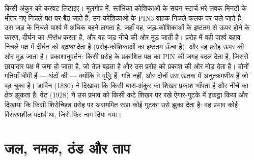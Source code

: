 \begin{example}[गुरुत्वानुवर्तन और प्रकाशानुवर्तन]\label{ex:b3:plant-molecular-physiology:tropism}
किसी अंकुर को करवट लिटाइए। मूलगोप में, स्तंभिका कोशिकाओं के सघन
स्टार्च-भरे लवक मिनटों के भीतर नए निचले पक्ष पर बैठ जाते हैं; उन
कोशिकाओं के PIN3 वाहक निचले फलक पर चले जाते हैं;  उस जड़ के निचले
पार्श्व में अधिक बहने लगता है, जहाँ वह, जड़-कोशिकाओं के इष्टतम से ऊपर
होने के कारण, दीर्घन का \emph{निरोध} करता है, और वह जड़ नीचे की ओर मुड़
जाती है। प्ररोह में वही पार्श्व बहाव निचले पक्ष में दीर्घन को
\emph{बढ़ावा} देता है (प्ररोह-कोशिकाओं का इष्टतम ऊँचा है), और वह प्ररोह
ऊपर की ओर मुड़ जाता है। प्रकाशानुवर्तन: किसी प्ररोह के प्रकाशित पक्ष का
 PIN की जगह बदल देता है, जिससे  छायादार पक्ष में जमा
हो जाता है, जो तेज़ बढ़ता है और उस प्ररोह को प्रकाश की ओर मोड़ देता है।
दोनों गतियाँ धीमी हैं --- घंटों की --- क्योंकि वे वृद्धि हैं, गति नहीं,
और दोनों उस ऊतक में अनुत्क्रमणीय हैं जो बढ़ चुका है। डार्विन (1880) ने
दिखाया कि किसी घास-अंकुर का शिखर प्रकाश भाँपता है और नीचे का क्षेत्र
झुकता है; वेंट (1928) ने उस प्रभाव को किसी कटे शिखर पर रखे ऐगार-गुटके
में इकट्ठा किया और दिखाया कि किसी शिरोच्छिन्न प्ररोह पर असममित रखा
कोई गुटका उसे झुका देता है: वह प्रभाव कोई विसरणशील पदार्थ था, जिसे फिर
 नाम दिया गया।
\end{example}

\section{जल, नमक, ठंड और ताप}


